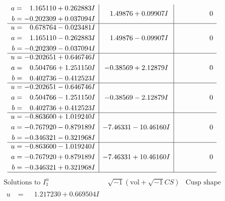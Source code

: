 \documentclass[1p]{elsarticle_modified}
\theoremstyle{definition}
\newcommand{\I}{\sqrt{-1}}
\begin{document}
$$\begin{array}{c|c|c}
\begin{aligned}
a &= \phantom{-}1.165110 + 0.262883 I \\
b &= -0.202309 + 0.037094 I\end{aligned}
 & \phantom{-}1.49876 + 0.09907 I & \phantom{-0.000000 } 0 \\ \hline\begin{aligned}
u &= \phantom{-}0.678764 - 0.023481 I \\
a &= \phantom{-}1.165110 - 0.262883 I \\
b &= -0.202309 - 0.037094 I\end{aligned}
 & \phantom{-}1.49876 - 0.09907 I & \phantom{-0.000000 } 0 \\ \hline\begin{aligned}
u &= -0.202651 + 0.646746 I \\
a &= \phantom{-}0.504766 + 1.251150 I \\
b &= \phantom{-}0.402736 - 0.412523 I\end{aligned}
 & -0.38569 + 2.12879 I & \phantom{-0.000000 } 0 \\ \hline\begin{aligned}
u &= -0.202651 - 0.646746 I \\
a &= \phantom{-}0.504766 - 1.251150 I \\
b &= \phantom{-}0.402736 + 0.412523 I\end{aligned}
 & -0.38569 - 2.12879 I & \phantom{-0.000000 } 0 \\ \hline\begin{aligned}
u &= -0.863600 + 1.019240 I \\
a &= -0.767920 - 0.879189 I \\
b &= -0.346321 - 0.321968 I\end{aligned}
 & -7.46331 - 10.46160 I & \phantom{-0.000000 } 0 \\ \hline\begin{aligned}
u &= -0.863600 - 1.019240 I \\
a &= -0.767920 + 0.879189 I \\
b &= -0.346321 + 0.321968 I\end{aligned}
 & -7.46331 + 10.46160 I & \phantom{-0.000000 } 0\\
 \hline 
 \end{array}$$\newpage$$\begin{array}{c|c|c}  
\text{Solutions to }I^u_{1}& \I (\text{vol} + \sqrt{-1}CS) & \text{Cusp shape}\\
 \hline 
\begin{aligned}
u &= \phantom{-}1.217230 + 0.669504 I \\

\end{aligned}
\end{array}$$
\end{document}

